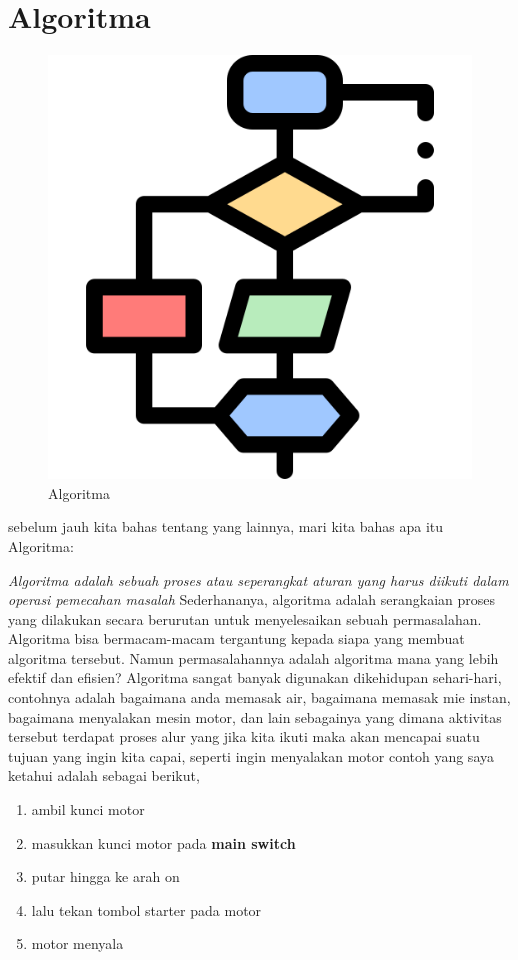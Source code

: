 \section{Algoritma}
\begin{figure}[H]
        \centerline{\includegraphics[scale=0.5]{figures/algoritma-kompleksitas/algoritma}}
        \caption{Algoritma}
\end{figure}
sebelum jauh kita bahas tentang yang lainnya, mari kita bahas apa itu Algoritma:

\textit{Algoritma adalah sebuah proses atau seperangkat aturan yang harus diikuti dalam operasi pemecahan masalah}
Sederhananya, algoritma adalah serangkaian proses yang dilakukan secara berurutan untuk menyelesaikan sebuah permasalahan. Algoritma bisa bermacam-macam tergantung kepada siapa yang membuat algoritma tersebut. Namun permasalahannya adalah algoritma mana yang lebih efektif dan efisien? Algoritma sangat banyak digunakan dikehidupan sehari-hari, contohnya adalah bagaimana anda memasak air, bagaimana memasak mie instan, bagaimana menyalakan mesin motor, dan lain sebagainya yang dimana aktivitas tersebut terdapat proses alur yang jika kita ikuti maka akan mencapai suatu tujuan yang ingin kita capai, seperti ingin menyalakan motor contoh yang saya ketahui adalah sebagai berikut,
\begin{enumerate}
\item ambil kunci motor
\item masukkan kunci motor pada \textbf{main switch}
\item putar hingga ke arah on
\item lalu tekan tombol starter pada motor
\item motor menyala
\end{enumerate}

